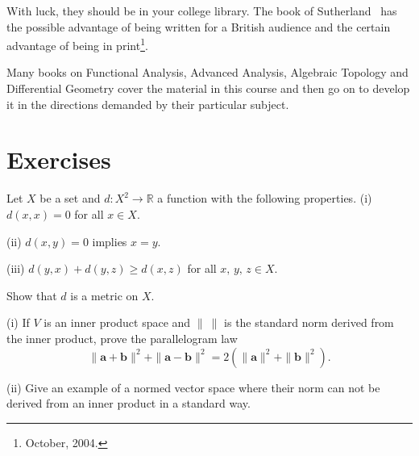 With luck, they should be in your college library. The book of Sutherland~\cite{Sutherland_1975}  has the possible advantage of being written for a British audience and the certain advantage of being in print\footnote{October, 2004.}.

Many books on Functional Analysis, Advanced Analysis, Algebraic Topology and Differential Geometry cover the material in this course and then go on to develop it in the directions demanded by their particular subject.




\section{Exercises}
\begin{problem}\label{E;axiom grubbing}
Let $X$ be a set and
$d:X^{2}\rightarrow{\mathbb R}$ a function with the
following properties.
\ben
(i) $d(x,x)=0$ for all $x\in X$.

(ii) $d(x,y)=0$ implies $x=y$.

(iii) $d(y,x)+d(y,z)\geq d(x,z)$ for all $x,\,y,\,z\in X$.
\een

\noindent Show that $d$ is a metric on $X$.
\end{problem}
\begin{problem}\label{E;parallelogram} (i) If $V$ is an inner product
space and $\|\ \|$ is the standard norm derived from the inner product,
prove the parallelogram law
\[\|{\mathbf a}+{\mathbf b}\|^{2}+\|{\mathbf a}-{\mathbf b}\|^{2}
=2(\|{\mathbf a}\|^{2}+\|{\mathbf b}\|^{2}).\]

(ii) Give an example of a normed vector space where
their norm can not be derived from an inner product
in a standard way.
\end{problem}
